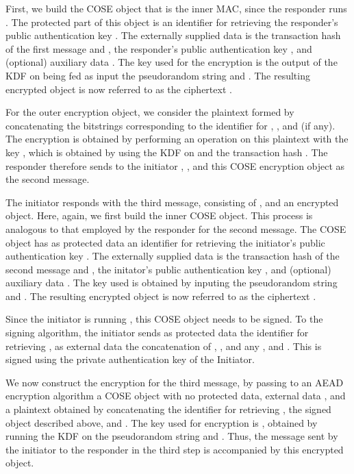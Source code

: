 First, we build the COSE object that is the inner MAC, since the responder runs \mStat. The protected part of this object is an identifier for retrieving the responder's public authentication key \mCredr. The externally supplied data is the transaction hash \mTHtwo of the first message and \mGy,  the responder's public authentication key \mCredr, and (optional) auxiliary data \mADtwo. The key used for the encryption is the output of the KDF on being fed as input the pseudorandom string \mPRKthree and \mTHtwo. The resulting encrypted object is now referred to as the ciphertext \mMactwo. 

For the outer encryption object, we consider the plaintext formed by concatenating the bitstrings corresponding to the identifier for \mCredr, \mMactwo, and \mADtwo (if any). The encryption is obtained by performing an \mXor operation on this plaintext with the key \mKtwo, which is obtained by using the KDF on \mPRKtwo and the transaction hash \mTHtwo. The responder therefore sends to the initiator \mGy, \mCr, and this COSE encryption object as the second message.

The initiator responds with the third message, consisting of \mCr, and an encrypted object. Here, again, we first build the inner COSE object. This process is analogous to that employed by the responder for the second message. The COSE object has as protected data an identifier for retrieving the initiator's public authentication key \mCredi. The externally supplied data is the transaction hash \mTHthree of the second message and \mTHtwo,  the initator's public authentication key \mCredi, and (optional) auxiliary data \mADthree. The key used is obtained by inputing the pseudorandom string \mPRKfour and \mTHthree. The resulting encrypted object is now referred to as the ciphertext \mMacthree. 

Since the initiator is running \mSig, this COSE object needs to be signed. To the signing algorithm, the initiator sends as protected data the identifier for retrieving \mCredi, as external data the concatenation of \mTHthree, \mCredi, and any \mADthree, and \mMacthree. This is signed using the private authentication key of the Initiator.  

We now construct the encryption for the third message, by passing to an AEAD encryption algorithm a COSE object with no protected data, external data \mTHthree, and a plaintext obtained by concatenating the identifier for retrieving \mCredi, the signed object described above, and \mADthree. The key used for encryption is \mKthree, obtained by running the KDF on the pseudorandom string \mPRKthree and \mTHthree. Thus, the message sent by the initiator to the responder in the third step is \mCr accompanied by this encrypted object.

